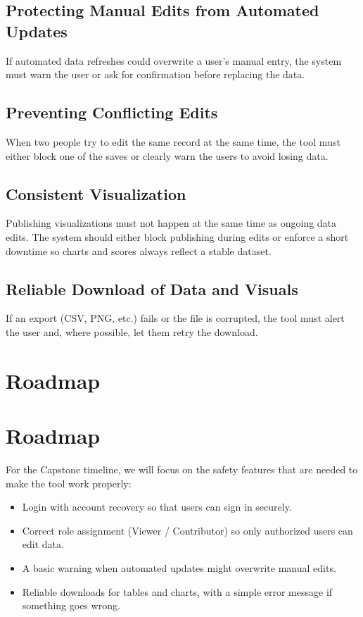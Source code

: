 \documentclass{article}
\begin{document}
\subsection*{Protecting Manual Edits from Automated Updates}
If automated data refreshes could overwrite a user’s manual entry, the system must warn the user or ask for confirmation before replacing the data.

\subsection*{Preventing Conflicting Edits}
When two people try to edit the same record at the same time, the tool must either block one of the saves or clearly warn the users to avoid losing data.

\subsection*{Consistent Visualization}
Publishing visualizations must not happen at the same time as ongoing data edits.
The system should either block publishing during edits or enforce a short downtime so charts and scores always reflect a stable dataset.

\subsection*{Reliable Download of Data and Visuals}
If an export (CSV, PNG, etc.) fails or the file is corrupted, the tool must alert the user and, where possible, let them retry the download.

\section{Roadmap}

\section{Roadmap}

For the Capstone timeline, we will focus on the safety features that are needed to make the tool work properly:

\begin{itemize}
    \item Login with account recovery so that users can sign in securely.
    \item Correct role assignment (Viewer / Contributor) so only authorized users can edit data.
    \item A basic warning when automated updates might overwrite manual edits.
    \item Reliable downloads for tables and charts, with a simple error message if something goes wrong.
\end{itemize}
\end{document}
